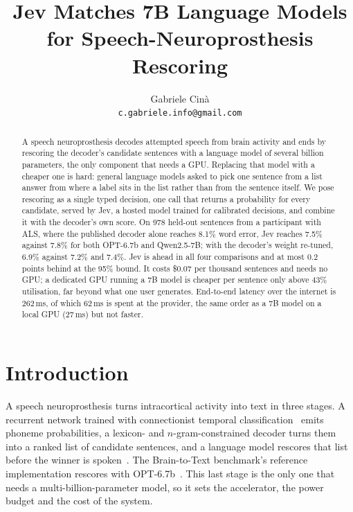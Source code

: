 \documentclass[11pt]{article}
\title{\bf Jev Matches 7B Language Models for Speech-Neuroprosthesis Rescoring}
\author{Gabriele Cin\`a\\\small\texttt{c.gabriele.info@gmail.com}}
\date{}
\begin{document}
\maketitle

\begin{abstract}
\noindent
A speech neuroprosthesis decodes attempted speech from brain activity and ends by
rescoring the decoder's candidate sentences with a language model of several billion
parameters, the only component that needs a GPU. Replacing that model with a cheaper one
is hard: general language models asked to pick one sentence from a list answer from where
a label sits in the list rather than from the sentence itself. We pose rescoring as a
single typed decision, one call that returns a probability for every candidate, served by
Jev, a hosted model trained for calibrated decisions, and combine it with the decoder's
own score. On 978 held-out sentences from a participant with ALS, where the published
decoder alone reaches 8.1\% word error, Jev reaches 7.5\% against 7.8\% for both OPT-6.7b
and Qwen2.5-7B; with the decoder's weight re-tuned, 6.9\% against 7.2\% and 7.4\%. Jev is
ahead in all four comparisons and at most 0.2 points behind at the 95\% bound. It costs
\$0.07 per thousand sentences and needs no GPU; a dedicated GPU running a 7B model is
cheaper per sentence only above 43\% utilisation, far beyond what one user generates.
End-to-end latency over the internet is 262\,ms, of which 62\,ms is spent at the provider,
the same order as a 7B model on a local GPU (27\,ms) but not faster.
\end{abstract}

\section{Introduction}

A speech neuroprosthesis turns intracortical activity into text in three stages. A
recurrent network trained with connectionist temporal classification~\cite{graves2006ctc}
emits phoneme probabilities, a lexicon- and $n$-gram-constrained decoder turns them into a
ranked list of candidate sentences, and a language model rescores that list before the
winner is spoken~\cite{willett2023,card2024}. The Brain-to-Text benchmark's reference
implementation rescores with OPT-6.7b~\cite{zhang2022opt,b2tbench}. This last stage is the
only one that needs a multi-billion-parameter model, so it sets the accelerator, the power
budget and the cost of the system.
\end{document}
